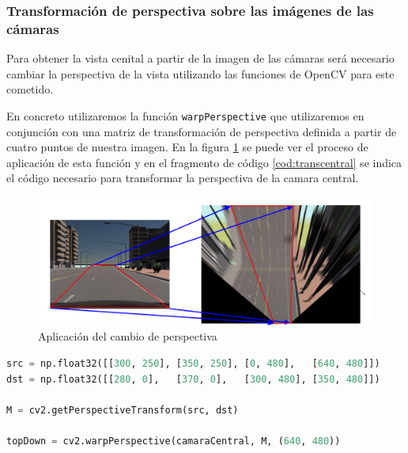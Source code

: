 \subsubsection{Transformación de perspectiva sobre las imágenes de las cámaras}

Para obtener la vista cenital a partir de la imagen de las cámaras será necesario cambiar la perspectiva de la vista utilizando las funciones de OpenCV para este cometido.

En concreto utilizaremos la función \texttt{warpPerspective} que utilizaremos en conjunción con una matriz de transformación de perspectiva definida a partir de cuatro puntos de nuestra imagen.
En la figura \ref{fig:persWarpDiam} se puede ver el proceso de aplicación de esta función y en el fragmento de código \ref{cod:transcentral} se indica el código necesario para transformar la perspectiva de la camara central.

\begin{figure}[h!]
    \centering
    \includegraphics[width=.95\linewidth]{img/PerspectivaWarp.png}
    \caption{Aplicación del cambio de perspectiva}
    \label{fig:persWarpDiam}
\end{figure}

\begin{lstlisting}[float, language=python,caption=Fragmento de código encargado de realizar la transformación de perspectiva de la cámara central, label={cod:transcentral}]
src = np.float32([[300, 250], [350, 250], [0, 480],   [640, 480]])
dst = np.float32([[280, 0],   [370, 0],   [300, 480], [350, 480]])

M = cv2.getPerspectiveTransform(src, dst)

topDown = cv2.warpPerspective(camaraCentral, M, (640, 480))
\end{lstlisting}


